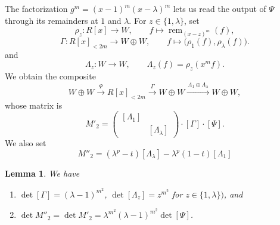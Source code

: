 \documentclass{amsart}
\newtheorem{lemma}[theorem]{Lemma}
\numberwithin{equation}{section}
\begin{document}
The factorization $g^m=(x-1)^m(x-\lambda)^m$ lets us read
the output of $\Psi$ through its remainders at $1$ and
$\lambda$. For $z\in\{1,\lambda\}$, set 
\[ \rho_z \colon  R[x]  \to W, \qquad 
  f\mapsto \operatorname{rem}_{(x-z)^m}(f),\]
\[\Gamma\colon R[x]_{<2m} \to W\oplus W, \qquad   f\mapsto \bigl(\rho_1(f),\rho_\lambda(f)\bigr).
\]
and
\[\Lambda_z \colon W\to W, \qquad  \Lambda_z(f)=\rho_z(x^mf).\]
We obtain the composite
\[
  W\oplus W
    \xrightarrow{\,\Psi \,} R[x]_{<2m}
    \xrightarrow{\,\Gamma\,} W\oplus W
    \xrightarrow{\,\Lambda_1\oplus \Lambda_\lambda\,} W\oplus W,
\]
whose matrix is
\begin{equation}\label{eq_K-product}
  M'_2=\begin{pmatrix} [\Lambda_1] & \\ &[\Lambda_\lambda] \end{pmatrix} \cdot  [\Gamma]\cdot [\Psi].
\end{equation}
We also set 
\begin{equation} \label{eq_Z-definition}
M''_2=(\lambda^p-t)[\Lambda_\lambda]-\lambda^p(1-t)[\Lambda_1]
\end{equation}


\begin{lemma}\label{lem_local-remainders}
We have 
\begin{enumerate}
    \item $\det[\Gamma]=(\lambda-1)^{m^2}$,
  $\det[\Lambda_z]=z^{m^2}$ for $z\in\{1,\lambda\})$, and 
  \item $\det M''_2=\det M'_2
    =\lambda^{m^2}(\lambda-1)^{m^2}\det[\Psi]$.
\end{enumerate}
\end{lemma}
\end{document}
